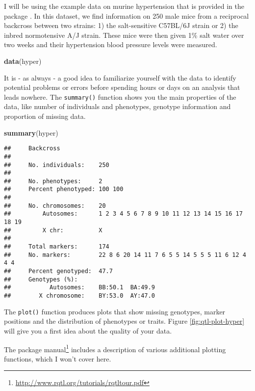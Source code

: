 \documentclass[12pt,]{krantz}
\newenvironment{Shaded}{\begin{snugshade}}{\end{snugshade}}
\newcommand{\KeywordTok}[1]{\textcolor[rgb]{0.27,0.27,0.27}{\textbf{{#1}}}}
\newcommand{\NormalTok}[1]{{#1}}
\renewcommand{\href}[2]{#2\footnote{\url{#1}}}
\theoremstyle{definition}
\theoremstyle{definition}
\theoremstyle{remark}
\begin{document}
I will be using the example data on murine hypertension that is provided
in the package \citep{Sugiyama200170}. In this dataset, we find
information on 250 male mice from a reciprocal backcross between two
strains: 1) the salt-sensitive C57BL/6J strain or 2) the inbred
normotensive A/J strain. These mice were then given 1\% salt water over
two weeks and their hypertension blood pressure levels were measured.

\begin{Shaded}
\begin{Highlighting}[]
\KeywordTok{data}\NormalTok{(hyper)}
\end{Highlighting}
\end{Shaded}

It is - as always - a good idea to familiarize yourself with the data to
identify potential problems or errors before spending hours or days on
an analysis that leads nowhere. The \texttt{summary()} function shows
you the main properties of the data, like number of individuals and
phenotypes, genotype information and proportion of missing data.

\begin{Shaded}
\begin{Highlighting}[]
\KeywordTok{summary}\NormalTok{(hyper)}
\end{Highlighting}
\end{Shaded}

\begin{verbatim}
##     Backcross
## 
##     No. individuals:    250 
## 
##     No. phenotypes:     2 
##     Percent phenotyped: 100 100 
## 
##     No. chromosomes:    20 
##         Autosomes:      1 2 3 4 5 6 7 8 9 10 11 12 13 14 15 16 17 18 19 
##         X chr:          X 
## 
##     Total markers:      174 
##     No. markers:        22 8 6 20 14 11 7 6 5 5 14 5 5 5 11 6 12 4 4 4 
##     Percent genotyped:  47.7 
##     Genotypes (%):    
##           Autosomes:    BB:50.1  BA:49.9 
##        X chromosome:    BY:53.0  AY:47.0
\end{verbatim}

The \texttt{plot()} function produces plots that show missing genotypes,
marker positions and the distribution of phenotypes or traits. Figure
\ref{fig:qtl-plot-hyper} will give you a first idea about the quality of
your data.

The \href{http://www.rqtl.org/tutorials/rqtltour.pdf}{package manual}
includes a description of various additional plotting functions, which I
won't cover here.
\end{document}
